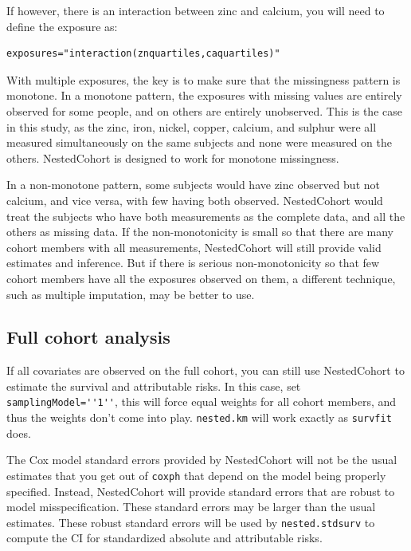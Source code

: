 \documentclass[10pt]{article}
\begin{document}
If however, there is an interaction between zinc and calcium, you will need to define the
exposure as:
\begin{verbatim}
exposures="interaction(znquartiles,caquartiles)"
\end{verbatim}


With multiple exposures, the key is to make sure that the missingness pattern is monotone.
In a monotone pattern, the exposures with missing values are entirely observed for some
people, and on others are entirely unobserved.  This is the case in this study, as the
zinc, iron, nickel, copper, calcium, and sulphur were all measured simultaneously on the
same subjects and none were measured on the others.  NestedCohort is designed to work for
monotone missingness.

In a non-monotone pattern, some subjects would have zinc observed but not calcium, and
vice versa, with few having both observed.  NestedCohort would treat the subjects who have
both measurements as the complete data, and all the others as missing data.  If the
non-monotonicity is small so that there are many cohort members with all measurements,
NestedCohort will still provide valid estimates and inference.  But if there is serious
non-monotonicity so that few cohort members have all the exposures observed on them, a
different technique, such as multiple imputation, may be better to use.


\subsection{Full cohort analysis}
\label{sec:full-cohort-analysis}

If all covariates are observed on the full cohort, you can still use NestedCohort to
estimate the survival and attributable risks.  In this case, set
\verb+samplingModel=''1''+, this will force equal weights for all cohort members, and
thus the weights don't come into play.  \texttt{nested.km} will work exactly as
\texttt{survfit} does. 

The Cox model standard errors provided by NestedCohort will not be the usual estimates
that you get out of \texttt{coxph} that depend on the model being properly specified.
Instead, NestedCohort will provide standard errors that are robust to model
misspecification.  These standard errors may be larger than the usual estimates.  These
robust standard errors will be used by \texttt{nested.stdsurv} to compute the CI for
standardized absolute and attributable risks.
\end{document}
